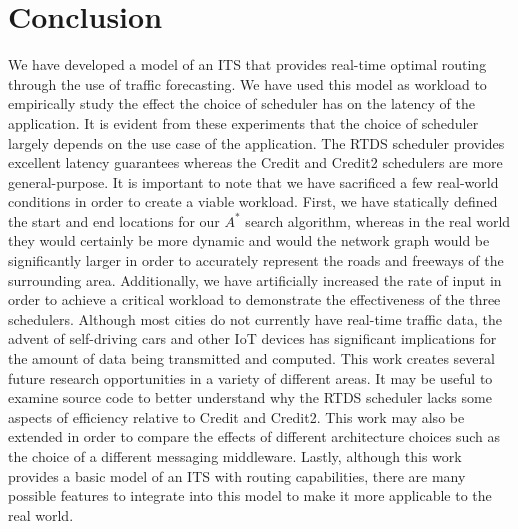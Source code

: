 \documentclass{article}
\begin{document}
\section{Conclusion}
We have developed a model of an ITS that provides real-time optimal routing through the use of traffic forecasting. We have used this model as workload to empirically study the effect the choice of scheduler has on the latency of the application. It is evident from these experiments that the choice of scheduler largely depends on the use case of the application. The RTDS scheduler provides excellent latency guarantees whereas the Credit and Credit2 schedulers are more general-purpose. It is important to note that we have sacrificed a few real-world conditions in order to create a viable workload. First, we have statically defined the start and end locations for our $A^{*}$ search algorithm, whereas in the real world they would certainly be more dynamic and would the network graph would be significantly larger in order to accurately represent the roads and freeways of the surrounding area. Additionally, we have artificially increased the rate of input in order to achieve a critical workload to demonstrate the effectiveness of the three schedulers. Although most cities do not currently have real-time traffic data, the advent of self-driving cars and other IoT devices has significant implications for the amount of data being transmitted and computed. This work creates several future research opportunities in a variety of different areas. It may be useful to examine source code to better understand why the RTDS scheduler lacks some aspects of efficiency relative to Credit and Credit2. This work may also be extended in order to compare the effects of different architecture choices such as the choice of a different messaging middleware. Lastly, although this work provides a basic model of an ITS with routing capabilities, there are many possible features to integrate into this model to make it more applicable to the real world. 


\end{document}
